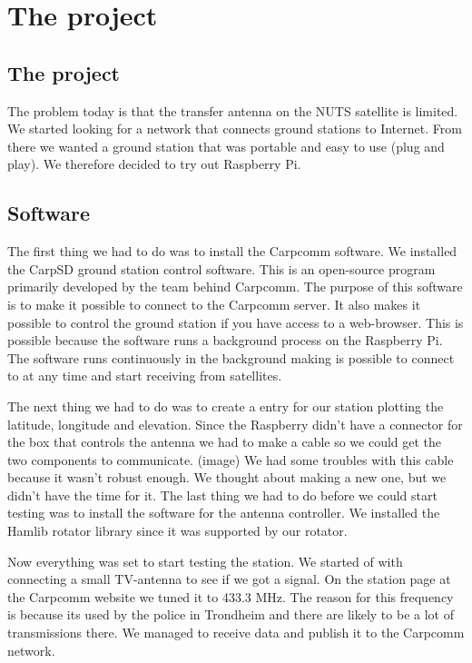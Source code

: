 \chapter{The project}
\label{chap:the_project}


\section {The project}

The problem today is that the transfer antenna on the NUTS satellite is limited. We started looking for a network that connects ground stations to Internet. From there we wanted a ground station that was portable and easy to use (plug and play). We therefore decided to try out Raspberry Pi.

\section {Software}

The first thing we had to do was to install the Carpcomm software. We installed the CarpSD ground station control software. This is an open-source program primarily developed by the team behind Carpcomm. The purpose of this software is to make it possible to connect to the Carpcomm server. It also makes it possible to control the ground station if you have access to a web-browser. This is possible because the software runs a background process on the Raspberry Pi. The software runs continuously in the background making is possible to connect to at any time and start receiving from satellites.

The next thing we had to do was to create a entry for our station plotting the latitude, longitude and elevation.    
Since the Raspberry didn’t have a connector for the box that controls the antenna we had to make a cable so we could get the two components to communicate. (image) 
We had some troubles with this cable because it wasn't robust enough. We thought about making a new one, but we didn't have the time for it. 
The last thing we had to do before we could start testing was to install the software for the antenna controller. We installed the Hamlib rotator library since it was supported by our rotator. 

Now everything was set to start testing the station. We started of with connecting a small TV-antenna to see if we got a signal. On the station page at the Carpcomm website we tuned it to 433.3 MHz. The reason for this  frequency is because its used by the police in Trondheim and there are likely to be a lot of transmissions there.  We managed to receive data and publish it to the Carpcomm network.


